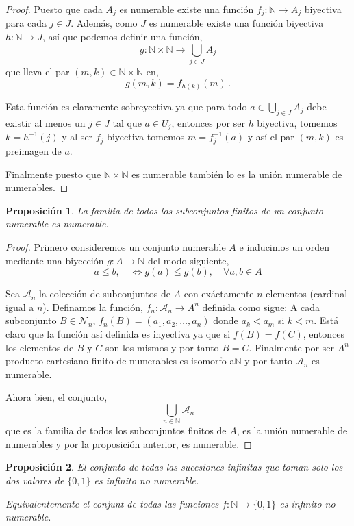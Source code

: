 \documentclass[12pt]{book}
\newtheorem{prop}{\bf Proposición}[chapter]
\def\NN{\mathbb{N}}
\begin{document}
\begin{proof}
Puesto que cada $A_j$  es numerable existe una función $f_j: \NN\longrightarrow A_j$ biyectiva 
para cada $j\in J$. Además, como $J$ es numerable existe una función biyectiva $h:
\NN\longrightarrow J$, así que podemos definir una función, 
$$g:\NN\times\NN\longrightarrow \bigcup_{j\in J} A_j$$
que lleva el par $(m,k)\in \NN\times \NN$  en,
$$g(m,k)=f_{h(k)}(m)\,.$$

Esta función es claramente sobreyectiva ya que  para todo $a\in \bigcup_{j\in J} A_j$ debe existir  
al menos un  $j\in J$ tal  que $a\in U_j$, entonces por ser $h$ biyectiva, tomemos $k=h^{-1}(j)$ y al 
ser $f_j$ biyectiva tomemos $m=f^{-1}_j(a)$ y así el  par $(m,k)$ es preimagen de $a$.

Finalmente puesto que $\NN\times\NN$  es numerable también lo es la unión numerable de 
numerables.
\end{proof}
\begin{prop} La familia de   todos los subconjuntos  finitos de un conjunto numerable es numerable.
\end{prop}
\begin{proof}
Primero consideremos un conjunto numerable $A$ e inducimos un orden mediante una biyección 
$g:A\longrightarrow \NN$  del modo siguiente,
$$a\leq b,\quad\Leftrightarrow  g(a)\leq g(b),\quad \forall a,b\in A$$

Sea $\mathcal{A}_n$  la colección de subconjuntos de $A$  con exáctamente  $n$ elementos 
(cardinal igual a $n$). Definamos la función, $f_n: \mathcal{A}_n\longrightarrow A^n$ definida como 
sigue:  
A cada subconjunto $B\in \mathcal{N}_n$, $f_n(B)=(a_1,a_2,\dots,a_n)$ donde $a_k<a_m$ si 
$k<m$. Está claro  que la función así definida es inyectiva ya que si $f(B)=f(C)$, entonces los 
elementos de $B$ y $C$ son los mismos y por tanto $B=C$. Finalmente por ser $A^n$ producto 
cartesiano  finito de numerables es isomorfo a$\NN$ y por tanto $\mathcal{A}_n$ es numerable.

Ahora bien, el conjunto,
$$\bigcup_{n\in\NN}\mathcal{A}_n$$
 que es  la familia de todos los subconjuntos finitos  de $A$, es la unión numerable de numerables 
y por  la proposición anterior, es numerable.  
\end{proof}
\begin{prop}
El conjunto de todas  las sucesiones infinitas que toman solo los dos valores de  $\{0,1\}$ es infinito 
no numerable.

Equivalentemente el conjunt de todas las funciones $f:\NN\longrightarrow \{0,1\}$ es infinito no 
numerable.
\end{prop}
\end{document}
